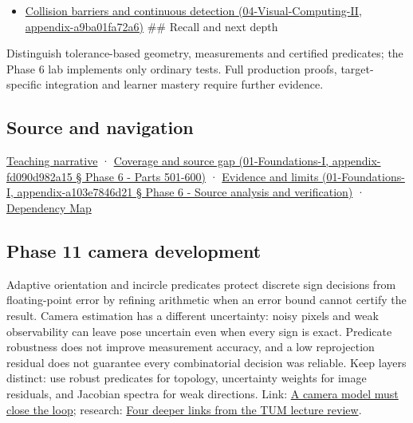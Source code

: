 \begin{itemize}
\tightlist
\item
  \href{}{Collision barriers and continuous detection (04-Visual-Computing-II, appendix-a9ba01fa72a6)} \#\# Recall and next depth
\end{itemize}

Distinguish tolerance-based geometry, measurements and certified predicates; the Phase 6 lab implements only ordinary tests. Full production proofs, target-specific integration and learner mastery require further evidence.

\subsection{Source and navigation}\label{source-and-navigation}

\href{Continuous\%20Notes/Computing\%20Foundations\%20-\%20From\%20Bits\%20to\%20C++\%20and\%20Systems\%20APIs\#The\%20sensor\%20needs\%20coordinates\%20inside\%20the\%20triangle}{Teaching narrative} · \href{}{Coverage and source gap (01-Foundations-I, appendix-fd090d982a15 § Phase 6 - Parts 501-600)} · \href{}{Evidence and limits (01-Foundations-I, appendix-a103e7846d21 § Phase 6 - Source analysis and verification)} · \hyperref[appendix-4ad47bdd269a]{Dependency Map}

\subsection{Phase 11 camera development}\label{phase-11-camera-development}

Adaptive orientation and incircle predicates protect discrete sign decisions from floating-point error by refining arithmetic when an error bound cannot certify the result. Camera estimation has a different uncertainty: noisy pixels and weak observability can leave pose uncertain even when every sign is exact. Predicate robustness does not improve measurement accuracy, and a low reprojection residual does not guarantee every combinatorial decision was reliable. Keep layers distinct: use robust predicates for topology, uncertainty weights for image residuals, and Jacobian spectra for weak directions. Link: \href{Continuous\%20Notes/Computing\%20Foundations\%20-\%20From\%20Bits\%20to\%20C++\%20and\%20Systems\%20APIs\#A\%20camera\%20model\%20must\%20close\%20the\%20loop}{A camera model must close the loop}; research: \href{Continuous\%20Notes/Computing\%20Foundations\%20-\%20From\%20Bits\%20to\%20C++\%20and\%20Systems\%20APIs\#Four\%20deeper\%20links\%20from\%20the\%20TUM\%20lecture\%20review}{Four deeper links from the TUM lecture review}.
